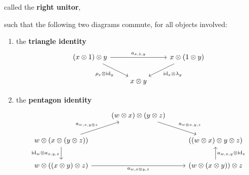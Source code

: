 \begin{definition}
\begin{enumerate}[label=(\roman*)]
      called the \textbf{right unitor},
  \end{enumerate}
  such that the following two diagrams commute, for all objects involved:
  \begin{enumerate}[label=(\roman*)]
    \item the \textbf{triangle identity}
      \[\begin{tikzcd}
	      {(x\otimes 1)\otimes y} && {x \otimes(1\otimes y)} \\
	                              & {x \otimes y}
	                              \arrow["{a_{x,1,y}}", from=1-1, to=1-3]
	                              \arrow["{\rho_x \otimes \text{id}_y}"', from=1-1, to=2-2]
	                              \arrow["{\text{id}_x \otimes \lambda_y}", from=1-3, to=2-2]
      \end{tikzcd}\]
    \item the \textbf{pentagon identity}
      \[\begin{tikzcd}
         & {(w\otimes x) \otimes (y \otimes z)} & \\
	      {w\otimes (x \otimes (y \otimes z))} & & {((w \otimes x)\otimes y \otimes z)} \\
	      {w \otimes ((x \otimes y) \otimes z)} && {(w\otimes (x \otimes y)) \otimes z}
	      \arrow["{\text{id}_w \otimes a_{x,y,z}}"', from=2-1, to=3-1]
	      \arrow["{a_{w,x,y\otimes z}}", from=2-1, to=1-2]
	      \arrow["{a_{w\otimes x,y,z}}", from=1-2, to=2-3]
	      \arrow["{a_{w,x,y}\otimes \text{id}_z}"', from=3-3, to=2-3]
	      \arrow["{a_{w,x\otimes y,z}}"', from=3-1, to=3-3]
      \end{tikzcd}\]
  \end{enumerate}
\end{definition}
